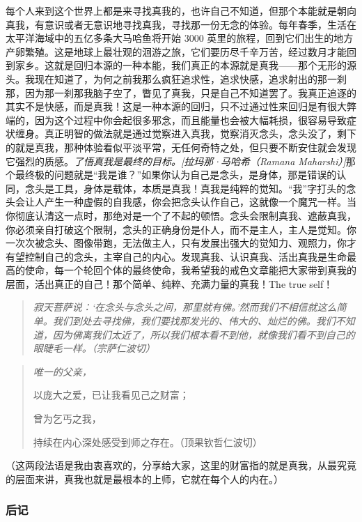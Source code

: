 每个人来到这个世界上都是来寻找真我的，也许自己不知道，但那个本能就是朝向真我，有意识或者无意识地寻找真我，寻找那一份无念的体验。每年春季，生活在太平洋海域中的五亿多条大马哈鱼将开始 3000 英里的旅程，回到它们出生的地方产卵繁殖。这是地球上最壮观的洄游之旅，它们要历尽千辛万苦，经过数月才能回到家乡。这就是回归本源的一种本能，我们真正的本源就是真我——那个无形的源头。我现在知道了，为何之前我那么疯狂追求性，追求快感，追求射出的那一刹那，因为那一刹那我脑子空了，瞥见了真我，只是自己不知道罢了。我真正追逐的其实不是快感，而是真我！这是一种本源的回归，只不过通过性来回归是有很大弊端的，因为这个过程中你会起很多邪念，而且能量也会被大幅耗损，很容易导致症状缠身。真正明智的做法就是通过觉察进入真我，觉察消灭念头，念头没了，剩下的就是真我，那种体验看似平淡平常，无任何奇特之处，但只要不断安住就会发现它强烈的质感。\textit{了悟真我是最终的目标。[拉玛那·马哈希（Ramana Maharshi）]}那个最终极的问题就是“我是谁？”如果你认为自己是念头，是身体，那是错误的认同，念头是工具，身体是载体，本质是真我！真我是纯粹的觉知。“我”字打头的念头会让人产生一种虚假的自我感，你会把念头认作自己，这就像一个魔咒一样。当你彻底认清这一点时，那绝对是一个了不起的顿悟。念头会限制真我、遮蔽真我，你必须亲自打破这个限制，念头的正确身份是仆人，而不是主人，主人是觉知。你一次次被念头、图像带跑，无法做主人，只有发展出强大的觉知力、观照力，你才有望控制自己的念头，主宰自己的内心。发现真我、认识真我、活出真我是生命最高的使命，每一个轮回个体的最终使命，我希望我的戒色文章能把大家带到真我的层面，活出真正的自己！那个简单、纯粹、充满力量的真我！The true self！

\begin{quote}\it
    寂天菩萨说：‘在念头与念头之间，那里就有佛。’然而我们不相信就这么简单。我们到处去寻找佛，我们要找那发光的、伟大的、灿烂的佛。我们不知道，因为佛离我们太近了，所以我们根本看不到他，就像我们看不到自己的眼睫毛一样。（宗萨仁波切）
\end{quote}

\begin{quotation}\it
唯一的父亲，

以庞大之爱，已让我看见己之财富；

曾为乞丐之我，

持续在内心深处感受到师之存在。（顶果钦哲仁波切）
\end{quotation}

（这两段法语是我由衷喜欢的，分享给大家，这里的财富指的就是真我，从最究竟的层面来讲，真我也就是最根本的上师，它就在每个人的内在。）

\subsubsection{后记}

